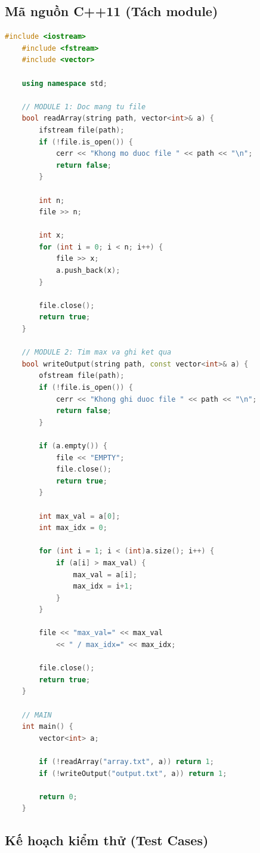 \subsection{Mã nguồn C++11 (Tách module)}
\begin{lstlisting}[language=C++, breaklines=true]
    #include <iostream>
    #include <fstream>
    #include <vector>

    using namespace std;

    // MODULE 1: Doc mang tu file
    bool readArray(string path, vector<int>& a) {
        ifstream file(path);
        if (!file.is_open()) {
            cerr << "Khong mo duoc file " << path << "\n";
            return false;
        }

        int n;
        file >> n;

        int x;
        for (int i = 0; i < n; i++) {
            file >> x;
            a.push_back(x);
        }

        file.close();
        return true;
    }

    // MODULE 2: Tim max va ghi ket qua
    bool writeOutput(string path, const vector<int>& a) {
        ofstream file(path);
        if (!file.is_open()) {
            cerr << "Khong ghi duoc file " << path << "\n";
            return false;
        }

        if (a.empty()) {
            file << "EMPTY";
            file.close();
            return true;
        }

        int max_val = a[0];
        int max_idx = 0;

        for (int i = 1; i < (int)a.size(); i++) {
            if (a[i] > max_val) {
                max_val = a[i];
                max_idx = i+1;
            }
        }

        file << "max_val=" << max_val
            << " / max_idx=" << max_idx;

        file.close();
        return true;
    }

    // MAIN
    int main() {
        vector<int> a;

        if (!readArray("array.txt", a)) return 1;
        if (!writeOutput("output.txt", a)) return 1;

        return 0;
    }
\end{lstlisting}

\subsection{Kế hoạch kiểm thử (Test Cases)}

